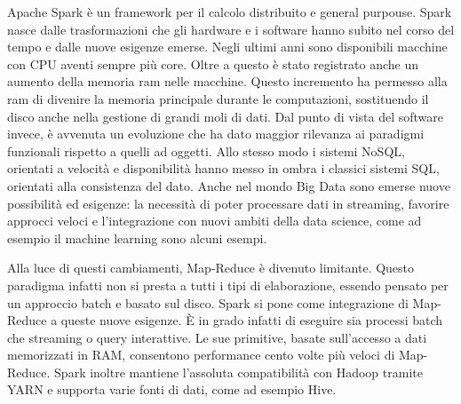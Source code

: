 Apache Spark è un framework per il calcolo distribuito e general purpouse.
Spark nasce dalle trasformazioni che gli hardware e i software hanno subito nel corso del tempo e dalle nuove esigenze emerse.
Negli ultimi anni sono disponibili macchine con CPU aventi sempre più core.
Oltre a questo è stato registrato anche un aumento della memoria ram nelle macchine.
Questo incremento ha permesso alla ram di divenire la memoria principale durante le computazioni, sostituendo il disco anche nella gestione di grandi moli di dati.
Dal punto di vista del software invece, è avvenuta un evoluzione che ha dato maggior rilevanza ai paradigmi funzionali rispetto a quelli ad oggetti.
Allo stesso modo i sistemi NoSQL, orientati a velocità e disponibilità hanno messo in ombra i classici sistemi SQL, orientati alla consistenza del dato.
Anche nel mondo Big Data sono emerse nuove possibilità ed esigenze: la necessità di poter processare dati in streaming, favorire approcci veloci e l'integrazione
con nuovi ambiti della data science, come ad esempio il machine learning sono alcuni esempi.

Alla luce di questi cambiamenti, Map-Reduce è divenuto limitante.
Questo paradigma infatti non si presta a tutti i tipi di elaborazione, essendo pensato per un approccio batch e basato sul disco.
Spark si pone come integrazione di Map-Reduce a queste nuove esigenze.
È in grado infatti di eseguire sia processi batch che streaming o query interattive.
Le sue primitive, basate sull'accesso a dati memorizzati in RAM, consentono performance cento volte più veloci di Map-Reduce.
Spark inoltre mantiene l'assoluta compatibilità con Hadoop tramite YARN e supporta varie fonti di dati, come ad esempio Hive.